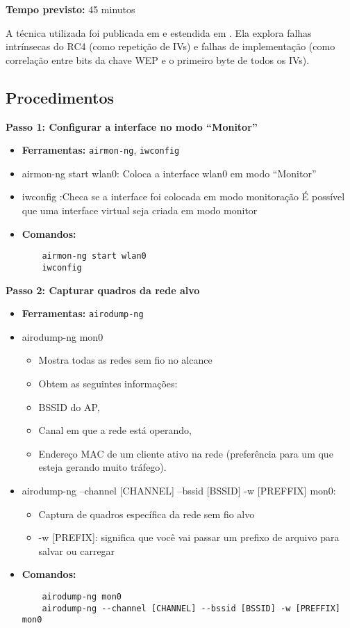 \textbf{Tempo previsto:} 45 minutos  

A técnica utilizada foi publicada em \cite{Fluhrer2001} e estendida em \cite{Tews2007}. Ela explora falhas intrínsecas do RC4 (como repetição de IVs) e falhas de implementação (como correlação entre bits da chave WEP e o primeiro byte de todos os IVs).

\subsection*{Procedimentos}

\textbf{Passo 1: Configurar a interface no modo “Monitor”}
\begin{itemize}
    \item \textbf{Ferramentas:} \texttt{airmon-ng}, \texttt{iwconfig}
    \item airmon-ng start wlan0: Coloca a interface wlan0 em modo “Monitor”
 \item iwconfig :Checa se a interface foi colocada em modo monitoração
É possível que uma interface virtual seja criada em modo monitor

    \item \textbf{Comandos:}
    \begin{verbatim}
    airmon-ng start wlan0
    iwconfig
    \end{verbatim}
\end{itemize}

\textbf{Passo 2: Capturar quadros da rede alvo}
\begin{itemize}
    \item \textbf{Ferramentas:} \texttt{airodump-ng}
 \item airodump-ng mon0
 \begin{itemize}
     \item Mostra todas as redes sem fio no alcance
     \item Obtem as seguintes informações:
     \item BSSID do AP,
     \item Canal em que a rede está operando,
     \item Endereço MAC de um cliente ativo na rede (preferência para um que esteja gerando muito tráfego).
 \end{itemize}
\item airodump-ng --channel [CHANNEL] --bssid [BSSID] -w [PREFFIX] mon0: 
\begin{itemize}
    \item Captura de quadros específica da rede sem fio alvo 
    \item -w [PREFIX]: significa que você vai passar um prefixo de arquivo para salvar ou carregar
\end{itemize}



    
    \item \textbf{Comandos:}
    \begin{verbatim}
    airodump-ng mon0
    airodump-ng --channel [CHANNEL] --bssid [BSSID] -w [PREFFIX] mon0
    \end{verbatim}
\end{itemize}


